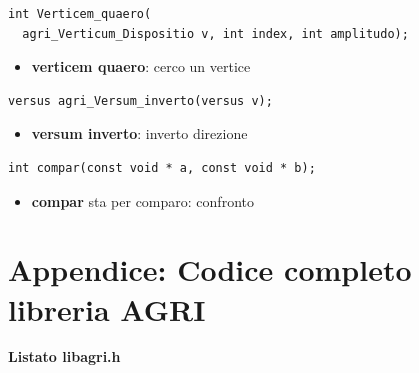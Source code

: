 \documentclass[8pt]{book}
\begin{document}
\begin{spacing}{0.9}
  \begin{small}
    \begin{tcolorbox}
\begin{verbatim}
int Verticem_quaero(
  agri_Verticum_Dispositio v, int index, int amplitudo);
\end{verbatim}
  \end{tcolorbox}
    \end{small}
      \end{spacing}

\begin{itemize}
\item
  \textbf{verticem quaero}: cerco un vertice
\end{itemize}

\begin{spacing}{0.9}
  \begin{small}
    \begin{tcolorbox}
\begin{verbatim}
versus agri_Versum_inverto(versus v);
\end{verbatim}
  \end{tcolorbox}
    \end{small}
      \end{spacing}

\begin{itemize}
\item
  \textbf{versum inverto}: inverto direzione
\end{itemize}

\begin{spacing}{0.9}
  \begin{small}
    \begin{tcolorbox}
\begin{verbatim}
int compar(const void * a, const void * b);
\end{verbatim}
  \end{tcolorbox}
    \end{small}
      \end{spacing}

\begin{itemize}
\item
  \textbf{compar} sta per comparo: confronto
\end{itemize}


\chapter[Codice libreria AGRI]{Appendice: Codice completo libreria AGRI}
\textbf{Listato libagri.h}

\end{document}
